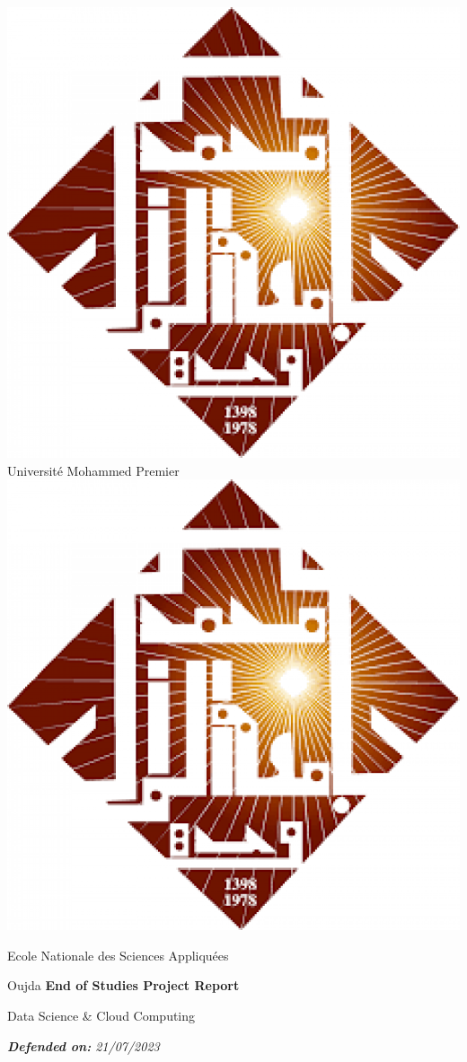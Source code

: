 \documentclass[a4paper,12pt,twoside]{report}
\begin{document}
\begin{titlepage}

\selectfont

\begin{center}
    \includegraphics[scale=0.1]{images/ump}\hfill
    \LARGE Université Mohammed Premier\hfill
    \includegraphics[scale=0.1]{images/ump}\par
    \Large Ecole Nationale des Sciences Appliquées\par
    \Large Oujda\vfill
    \Large\textbf{End of Studies Project Report}\par
    \large Data Science \& Cloud Computing\par
    \textit{\textbf{Defended on:} 21/07/2023}\par
\end{center}




\end{titlepage}
\end{document}
